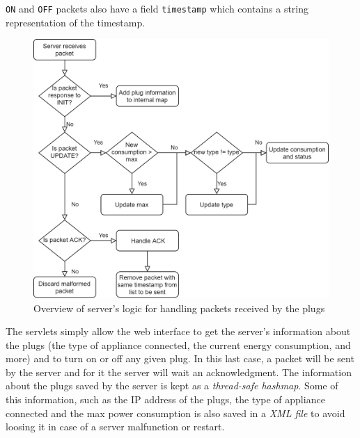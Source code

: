 \documentclass[conference]{IEEEtran}
\begin{document}
\verb|ON| and \verb|OFF| packets also have a field \verb|timestamp| which contains a string representation of the timestamp.  
\begin{figure}
	\centering
	\includegraphics[width=\linewidth]{assets/server_logic}
	\caption{Overview of server's logic for handling packets received by the plugs}
	\label{fig:server_logic}
\end{figure}
The servlets simply allow the web interface to get the server's information about the plugs (the type of appliance connected, the current energy consumption, and more) and to turn on or off any given plug. In this last case, a packet will be sent by the server and for it the server will wait an acknowledgment. The information about the plugs saved by the server is kept as a \textit{thread-safe hashmap}. Some of this information, such as the IP address of the plugs, the type of appliance connected and the max power consumption is also saved in a \textit{XML file} to avoid loosing it in case of a server malfunction or restart.
\end{document}
